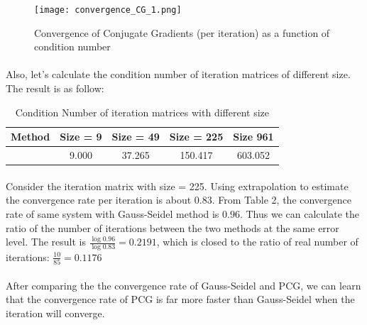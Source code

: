 \documentclass{article}
\begin{document}
\begin{figure}[h]
\centering
\texttt{[image: convergence\_CG\_1.png]}
\caption{Convergence of Conjugate Gradients (per iteration) as a function of condition number}
\label{overflow}
\end{figure}

\paragraph{}
Also, let's calculate the condition number of iteration matrices of different size. The result is as follow:
\begin{table}[h]
\begin{center}
\begin{tabular}{lcccc}
\hline
Method & Size = 9 & Size = 49 & Size = 225 & Size 961 \\
\hline
& 9.000 & 37.265 & 150.417 & 603.052\\
\hline
\end{tabular}
\caption{Condition Number of iteration matrices with different size}
\end{center}
\end{table}

\paragraph{}
Consider the iteration matrix with size = 225. Using extrapolation to estimate the convergence rate per iteration is about $0.83$. From Table 2, the convergence rate of same system with Gauss-Seidel method is $0.96$. Thus we can calculate the ratio of the number of iterations between the two methods at the same error level. The result is $\frac{\log0.96}{\log0.83} = 0.2191$, which is closed to the ratio of real number of iterations: $\frac{10}{85} = 0.1176$

\paragraph{}
After comparing the the convergence rate of Gauss-Seidel and PCG, we can learn that the convergence rate of PCG is far more faster than Gauss-Seidel when the iteration will converge.
\end{document}
